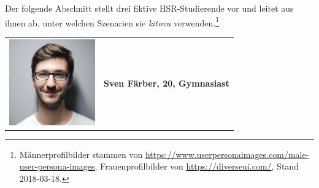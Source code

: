 \documentclass[a4paper]{article}
\begin{document}
Der folgende Abschnitt stellt drei fiktive HSR-Studierende vor und leitet aus ihnen ab, unter welchen Szenarien sie \emph{kitovu} verwenden.\footnote{Männerprofilbilder stammen von \url{https://www.userpersonaimages.com/male-user-persona-images}, Frauenprofilbilder von \url{https://diverseui.com/}, Stand 2018-03-18. }


\begin{tabulary}{\linewidth}{m{10em}l}
		\includegraphics[width=10em]{./img/userpersonaimages01.png} & \textbf{{\large Sven Färber, 20, Gymnasiast}} \\
\end{tabulary}
\end{document}

